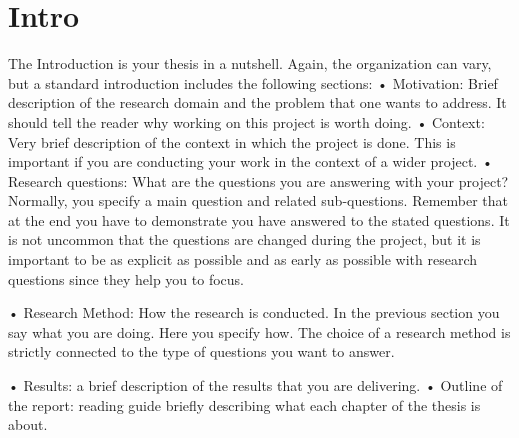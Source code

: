 \section{Intro}

The Introduction is your thesis in a nutshell. Again, the organization can vary, but a
standard introduction includes the following sections:
• Motivation: Brief description of the research domain and the problem that one
wants to address. It should tell the reader why working on this project is worth
doing.
• Context: Very brief description of the context in which the project is done. This
is important if you are conducting your work in the context of a wider project.
• Research questions: What are the questions you are answering with your
project? Normally, you specify a main question and related sub-questions.
Remember that at the end you have to demonstrate you have answered to the
stated questions. It is not uncommon that the questions are changed during the
project, but it is important to be as explicit as possible and as early as possible
with research questions since they help you to focus.

• Research Method: How the research is conducted. In the previous section you
say what you are doing. Here you specify how. The choice of a research method
is strictly connected to the type of questions you want to answer.

• Results: a brief description of the results that you are delivering.
• Outline of the report: reading guide briefly describing what each chapter of the
thesis is about.